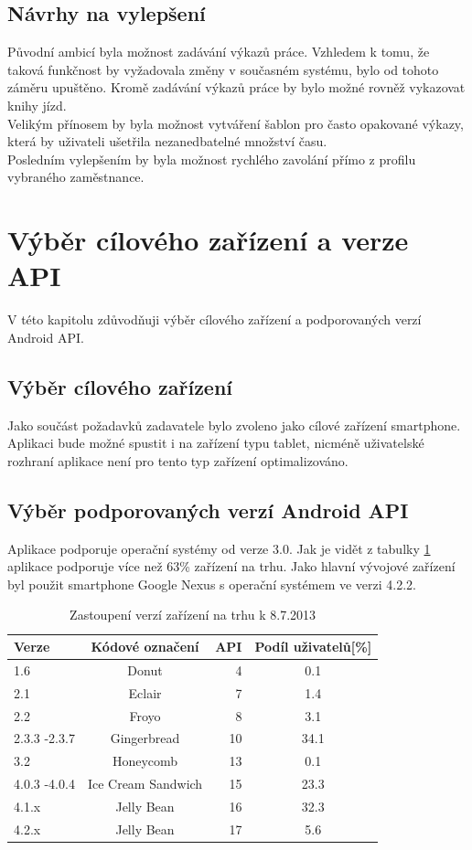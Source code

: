 \documentclass{diplomka}
\begin{document}
\subsection{Návrhy na vylepšení}
Původní ambicí byla možnost zadávání výkazů práce. Vzhledem k tomu, že taková funkčnost by vyžadovala změny v současném systému, bylo od tohoto záměru upuštěno. Kromě zadávání výkazů práce by bylo možné rovněž vykazovat knihy jízd.\\ \indent
Velikým přínosem by byla možnost vytváření šablon pro často opakované výkazy, která by uživateli ušetřila nezanedbatelné množství času.\\ \indent
Posledním vylepšením by byla možnost rychlého zavolání přímo z profilu vybraného zaměstnance.
  
\section{Výběr cílového zařízení a verze API}
V této kapitolu zdůvodňuji výběr cílového zařízení a podporovaných verzí Android API.
\subsection{Výběr cílového zařízení}
Jako součást požadavků zadavatele bylo zvoleno jako cílové zařízení smartphone. Aplikaci bude možné spustit i na zařízení typu tablet, nicméně uživatelské rozhraní aplikace není pro tento typ zařízení optimalizováno.

\subsection{Výběr podporovaných verzí Android API}
Aplikace podporuje operační systémy od verze 3.0. Jak je vidět z tabulky \ref{tab:share} aplikace podporuje více než 63\% zařízení na trhu. Jako hlavní vývojové zařízení byl použit smartphone Google Nexus s operační systémem ve verzi 4.2.2.


\begin{table}[H]\footnotesize
\begin{center}
  \begin{tabular}{| l | c | r | c |}
    \hline
Verze&Kódové označení&API&Podíl uživatelů[\%]\\ \hline
  1.6&Donut&4&0.1\\ \hline
2.1&Eclair&7&1.4\\ \hline
2.2&Froyo&8&3.1\\ \hline
2.3.3 -2.3.7&Gingerbread&10&34.1\\ \hline
3.2&Honeycomb&13&0.1\\ \hline
4.0.3 -4.0.4&Ice Cream Sandwich&15&23.3\\ \hline
4.1.x&Jelly Bean&16&32.3\\ \hline
4.2.x&Jelly Bean&17&5.6\\ \hline
  \end{tabular}
\end{center}
\caption{Zastoupení verzí zařízení na trhu k 8.7.2013\cite{share}}
\label{tab:share}
\end{table}
\end{document}
